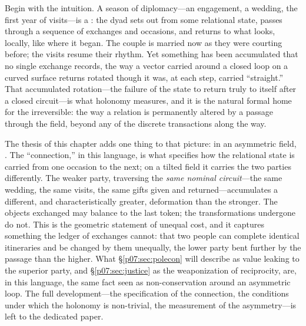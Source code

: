 \documentclass[11pt,a4paper]{article}
\newcommand{\emb}[1]{\textcolor{rose}{\oldtextbf{#1}}}
\newcommand{\xref}[1]{\textcolor{rose}{\S\ref{#1}}}
\begin{document}
Begin with the intuition. A season of diplomacy---an engagement, a wedding, the first year of visits---is a \emb{circuit}: the dyad sets out from some relational state, passes through a sequence of exchanges and occasions, and returns to what looks, locally, like where it began. The couple is married now as they were courting before; the visits resume their rhythm. Yet something has been accumulated that no single exchange records, the way a vector carried around a closed loop on a curved surface returns rotated though it was, at each step, carried ``straight.'' That accumulated rotation---the failure of the state to return truly to itself after a closed circuit---is what holonomy measures, and it is the natural formal home for the irreversible: the way a relation is permanently altered by a passage through the field, beyond any of the discrete transactions along the way.

The thesis of this chapter adds one thing to that picture: in an asymmetric field, \emb{the connection itself is asymmetric}. The ``connection,'' in this language, is what specifies how the relational state is carried from one occasion to the next; on a tilted field it carries the two parties differently. The weaker party, traversing the \emph{same nominal circuit}---the same wedding, the same visits, the same gifts given and returned---accumulates a different, and characteristically greater, deformation than the stronger. The objects exchanged may balance to the last token; the transformations undergone do not. This is the geometric statement of unequal cost, and it captures something the ledger of exchanges cannot: that two people can complete identical itineraries and be changed by them unequally, the lower party bent further by the passage than the higher. What \xref{p07:sec:polecon} will describe as value leaking to the superior party, and \xref{p07:sec:justice} as the weaponization of reciprocity, are, in this language, the same fact seen as non-conservation around an asymmetric loop. The full development---the specification of the connection, the conditions under which the holonomy is non-trivial, the measurement of the asymmetry---is left to the dedicated paper.
\end{document}
